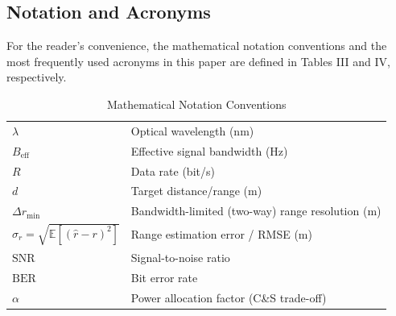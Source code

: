 \subsection{Notation and Acronyms}

For the reader's convenience, the mathematical notation conventions and the most frequently used acronyms in this paper are defined in Tables III and IV, respectively.

\begin{table}[htbp]
\caption{Mathematical Notation Conventions}
\label{tab:math_notation}
\centering
\setlength{\tabcolsep}{4pt}
\renewcommand{\arraystretch}{1.1}
\begin{tabularx}{\textwidth}{@{}L{4.8cm}Y@{}}
\toprule
{} &  \\
\midrule
$\lambda$ & Optical wavelength (nm) \\
$B_{\text{eff}}$ & Effective signal bandwidth (Hz) \\
$R$ & Data rate (bit/s) \\
$d$ & Target distance/range (m) \\
$\Delta r_{\min}$ & Bandwidth-limited (two-way) range resolution (m) \\
$\sigma_r = \sqrt{\mathbb{E}[(\hat r - r)^2]}$ & Range estimation error / RMSE (m) \\
$\text{SNR}$ & Signal-to-noise ratio \\
$\text{BER}$ & Bit error rate \\
$\alpha$ & Power allocation factor (C\&S trade-off) \\
\bottomrule
\end{tabularx}
\end{table}


